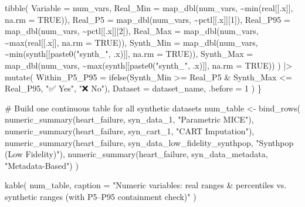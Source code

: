 \documentclass[
  letterpaper,
  DIV=11,
  numbers=noendperiod]{scrartcl}
\newenvironment{Shaded}{\begin{snugshade}}{\end{snugshade}}
\newcommand{\AttributeTok}[1]{\textcolor[rgb]{0.40,0.45,0.13}{#1}}
\newcommand{\CommentTok}[1]{\textcolor[rgb]{0.37,0.37,0.37}{#1}}
\newcommand{\ConstantTok}[1]{\textcolor[rgb]{0.56,0.35,0.01}{#1}}
\newcommand{\DecValTok}[1]{\textcolor[rgb]{0.68,0.00,0.00}{#1}}
\newcommand{\FunctionTok}[1]{\textcolor[rgb]{0.28,0.35,0.67}{#1}}
\newcommand{\NormalTok}[1]{\textcolor[rgb]{0.00,0.23,0.31}{#1}}
\newcommand{\OtherTok}[1]{\textcolor[rgb]{0.00,0.23,0.31}{#1}}
\newcommand{\SpecialCharTok}[1]{\textcolor[rgb]{0.37,0.37,0.37}{#1}}
\newcommand{\StringTok}[1]{\textcolor[rgb]{0.13,0.47,0.30}{#1}}
\begin{document}
\begin{Shaded}
\begin{Highlighting}[]
  \FunctionTok{tibble}\NormalTok{(}
    \AttributeTok{Variable =}\NormalTok{ num\_vars,}
    \AttributeTok{Real\_Min =} \FunctionTok{map\_dbl}\NormalTok{(num\_vars, }\SpecialCharTok{\textasciitilde{}}\FunctionTok{min}\NormalTok{(real[[.x]], }\AttributeTok{na.rm =} \ConstantTok{TRUE}\NormalTok{)),}
    \AttributeTok{Real\_P5  =} \FunctionTok{map\_dbl}\NormalTok{(num\_vars, }\SpecialCharTok{\textasciitilde{}}\NormalTok{pctl[[.x]][}\DecValTok{1}\NormalTok{]),}
    \AttributeTok{Real\_P95 =} \FunctionTok{map\_dbl}\NormalTok{(num\_vars, }\SpecialCharTok{\textasciitilde{}}\NormalTok{pctl[[.x]][}\DecValTok{2}\NormalTok{]),}
    \AttributeTok{Real\_Max =} \FunctionTok{map\_dbl}\NormalTok{(num\_vars, }\SpecialCharTok{\textasciitilde{}}\FunctionTok{max}\NormalTok{(real[[.x]], }\AttributeTok{na.rm =} \ConstantTok{TRUE}\NormalTok{)),}
    \AttributeTok{Synth\_Min =} \FunctionTok{map\_dbl}\NormalTok{(num\_vars, }\SpecialCharTok{\textasciitilde{}}\FunctionTok{min}\NormalTok{(synth[[}\FunctionTok{paste0}\NormalTok{(}\StringTok{"synth\_"}\NormalTok{, .x)]], }\AttributeTok{na.rm =} \ConstantTok{TRUE}\NormalTok{)),}
    \AttributeTok{Synth\_Max =} \FunctionTok{map\_dbl}\NormalTok{(num\_vars, }\SpecialCharTok{\textasciitilde{}}\FunctionTok{max}\NormalTok{(synth[[}\FunctionTok{paste0}\NormalTok{(}\StringTok{"synth\_"}\NormalTok{, .x)]], }\AttributeTok{na.rm =} \ConstantTok{TRUE}\NormalTok{))}
\NormalTok{  ) }\SpecialCharTok{|\textgreater{}}
    \FunctionTok{mutate}\NormalTok{(}
      \AttributeTok{Within\_P5\_P95 =} \FunctionTok{ifelse}\NormalTok{(Synth\_Min }\SpecialCharTok{\textgreater{}=}\NormalTok{ Real\_P5 }\SpecialCharTok{\&}\NormalTok{ Synth\_Max }\SpecialCharTok{\textless{}=}\NormalTok{ Real\_P95, }\StringTok{"✅ Yes"}\NormalTok{, }\StringTok{"❌ No"}\NormalTok{),}
      \AttributeTok{Dataset =}\NormalTok{ dataset\_name,}
      \AttributeTok{.before =} \DecValTok{1}
\NormalTok{    )}
\NormalTok{\}}

\CommentTok{\# Build one continuous table for all synthetic datasets}
\NormalTok{num\_table }\OtherTok{\textless{}{-}} \FunctionTok{bind\_rows}\NormalTok{(}
  \FunctionTok{numeric\_summary}\NormalTok{(heart\_failure, syn\_data\_1, }\StringTok{"Parametric MICE"}\NormalTok{),}
  \FunctionTok{numeric\_summary}\NormalTok{(heart\_failure, syn\_cart\_1, }\StringTok{"CART Imputation"}\NormalTok{),}
  \FunctionTok{numeric\_summary}\NormalTok{(heart\_failure, syn\_data\_low\_fidelity\_synthpop, }\StringTok{"Synthpop (Low Fidelity)"}\NormalTok{),}
  \FunctionTok{numeric\_summary}\NormalTok{(heart\_failure, syn\_data\_metadata, }\StringTok{"Metadata{-}Based"}\NormalTok{)}
\NormalTok{)}

\FunctionTok{kable}\NormalTok{(}
\NormalTok{  num\_table,}
  \AttributeTok{caption =} \StringTok{"Numeric variables: real ranges \& percentiles vs. synthetic ranges (with P5–P95 containment check)"}
\NormalTok{)}
\end{Highlighting}
\end{Shaded}
\end{document}
